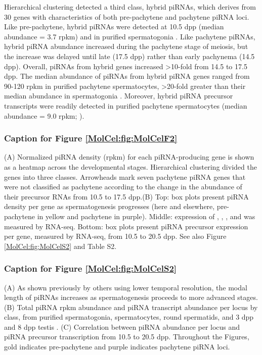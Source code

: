     Hierarchical clustering detected a third class, hybrid piRNAs, which derives from 30 genes with characteristics of both pre-pachytene and pachytene piRNA loci. Like pre-pachytene, hybrid piRNAs were detected at 10.5 dpp (median abundance = 3.7 rpkm) and in purified spermatogonia \citep{Gan2011}. Like pachytene piRNAs, hybrid piRNA abundance increased during the pachytene stage of meiosis, but the increase was delayed until late (17.5 dpp) rather than early pachynema (14.5 dpp). Overall, piRNAs from hybrid genes increased >10-fold from 14.5 to 17.5 dpp. The median abundance of piRNAs from hybrid piRNA genes ranged from 90-120 rpkm in purified pachytene spermatocytes, >20-fold greater than their median abundance in spermatogonia \citep{Gan2011,Modzelewski2012}. Moreover, hybrid piRNA precursor transcripts were readily detected in purified pachytene spermatocytes (median abundance = 9.0 rpkm; \citep{Modzelewski2012}).

    \subsubsection{Caption for Figure \ref{MolCel:fig:MolCelF2}}
      \label{MolCel:subsubsection:cap:Figure F2}
      (A) Normalized piRNA density (rpkm) for each piRNA-producing gene is shown as a heatmap across the developmental stages. Hierarchical clustering divided the genes into three classes. Arrowheads mark seven pachytene piRNA genes that were not classified as pachytene according to the change in the abundance of their precursor RNAs from 10.5 to 17.5 dpp.(B) Top: box plots present piRNA density per gene as spermatogenesis progresses (here and elsewhere, pre-pachytene in yellow and pachytene in purple). Middle: expression of \amyb{}, \bmyb{}, \mili{}, and \miwi{} was measured by RNA-seq. Bottom: box plots present piRNA precursor expression per gene, measured by RNA-seq, from 10.5 to 20.5 dpp. See also Figure \ref{MolCel:fig:MolCelS2} and Table S2.

    \subsubsection{Caption for Figure \ref{MolCel:fig:MolCelS2}}
      \label{MolCel:subsubsection:cap:Figure S2}
      (A) As shown previously by others using lower temporal resolution, the modal length of piRNAs increases as spermatogenesis proceeds to more advanced stages. (B) Total piRNA rpkm abundance and piRNA transcript abundance per locus by class, from purified spermatogonia, spermatocytes, round spermatids, and 3 dpp and 8 dpp testis \citep{Gan2011, Modzelewski2012}. (C) Correlation between piRNA abundance per locus and piRNA precursor transcription from 10.5 to 20.5 dpp. Throughout the Figures, gold indicates pre-pachytene and purple indicates pachytene piRNA loci.

